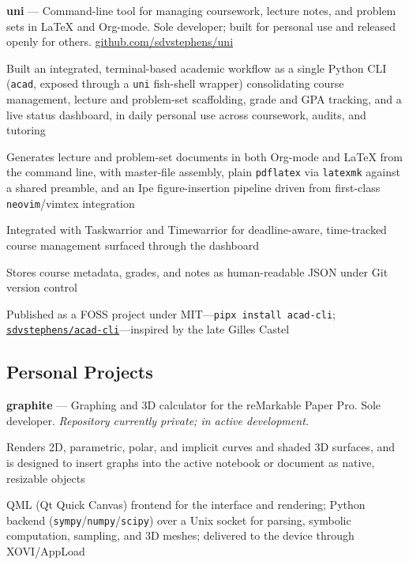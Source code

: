 \documentclass[11pt,letterpaper]{report} %
\newcommand{\listitemspace}{0.25em}
\renewenvironment{itemize}
{\begin{list}{}{\setlength{\leftmargin}{0em}
                \setlength{\parskip}{0em}
                \setlength{\itemsep}{\listitemspace}
                \setlength{\parsep}{\listitemspace}}}
{\end{list}}
\begin{document}
    \begin{tablist}
        \item[2023--]   \tab{}\textbf{uni} --- Command-line tool for managing coursework, lecture notes, and problem sets in \LaTeX{} and Org-mode. Sole developer; built for personal use and released openly for others. \href{https://github.com/sdvstephens/uni}{github.com/sdvstephens/uni}
    \end{tablist}
    \begin{itemize}
        \item Built an integrated, terminal-based academic workflow as a single Python CLI (\texttt{acad}, exposed through a \texttt{uni} fish-shell wrapper) consolidating course management, lecture and problem-set scaffolding, grade and GPA tracking, and a live status dashboard, in daily personal use across coursework, audits, and tutoring
        \item Generates lecture and problem-set documents in both Org-mode and \LaTeX{} from the command line, with master-file assembly, plain \texttt{pdflatex} via \texttt{latexmk} against a shared preamble, and an Ipe figure-insertion pipeline driven from first-class \texttt{neovim}/vimtex integration
        \item Integrated with Taskwarrior and Timewarrior for deadline-aware, time-tracked course management surfaced through the dashboard
        \item Stores course metadata, grades, and notes as human-readable JSON under Git version control
        \item Published as a FOSS project under MIT---\texttt{pipx install acad-cli}; \href{https://github.com/sdvstephens/acad-cli}{\texttt{sdvstephens/acad-cli}}---inspired by the late Gilles Castel
    \end{itemize}

    \subsection*{Personal Projects}
    \begin{tablist}
        \item[2026--]   \tab{}\textbf{graphite} --- Graphing and 3D calculator for the reMarkable Paper Pro. Sole developer. \textit{Repository currently private; in active development.}
    \end{tablist}
    \begin{itemize}
        \item Renders 2D, parametric, polar, and implicit curves and shaded 3D surfaces, and is designed to insert graphs into the active notebook or document as native, resizable objects
        \item QML (Qt Quick Canvas) frontend for the interface and rendering; Python backend (\texttt{sympy}/\texttt{numpy}/\texttt{scipy}) over a Unix socket for parsing, symbolic computation, sampling, and 3D meshes; delivered to the device through XOVI/AppLoad
    \end{itemize}
\end{document}
